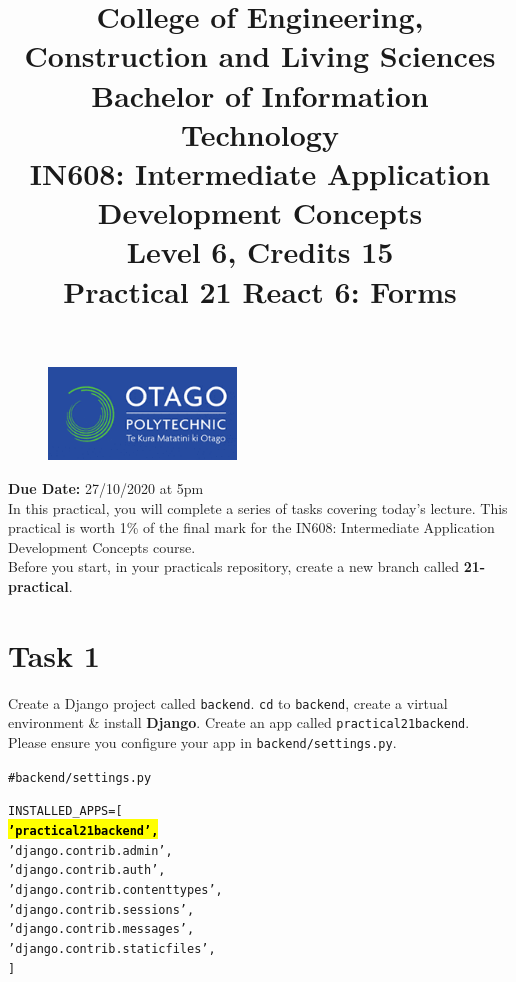 \documentclass{article}
\author{}
\begin{document}
\begin{figure}
	\centering
	\includegraphics[width=50mm]{img/logo.png}
\end{figure}

\title{College of Engineering, Construction and Living Sciences\\Bachelor of Information Technology\\IN608: Intermediate Application Development Concepts\\Level 6, Credits 15\\\textbf{Practical 21 React 6: Forms}} 
\date{}
\maketitle

\textbf{Due Date:} 27/10/2020 at 5pm \\

In this practical, you will complete a series of tasks covering today's lecture. This practical is worth 1\% of the final mark for the IN608: Intermediate Application Development Concepts course. \\

Before you start, in your practicals repository, create a new branch called \textbf{21-practical}. \\

\section*{Task 1} 
Create a Django project called \texttt{backend}. \texttt{cd} to \texttt{backend}, create a virtual environment \& install \textbf{Django}. Create an app called \texttt{practical21backend}. Please ensure you configure your app in \texttt{backend/settings.py}.

\begin{alltt}
  # backend/settings.py

  INSTALLED_APPS = [
      \hl{\textbf{'practical21backend',}} 
      'django.contrib.admin',
      'django.contrib.auth',
      'django.contrib.contenttypes',
      'django.contrib.sessions',
      'django.contrib.messages',
      'django.contrib.staticfiles',
  ]
\end{alltt}
\end{document}
